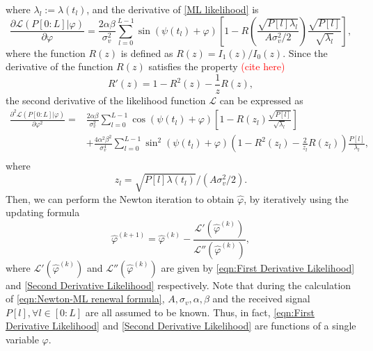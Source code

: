 \documentclass[12pt,draftclsnofoot,journal,onecolumn]{IEEEtran}
\theoremstyle{nonumberplain}
\def \ch {\textcolor{red}{(cite here) }}
\begin{document}
    where $\lambda_l := \lambda(t_l)$, and the derivative of \eqref{ML likelihood} is 
    \begin{equation}
        \frac{\partial \mathcal{L}(P[0:L] | \varphi)}{\partial \varphi} = \frac{2\alpha\beta}{\sigma_v^2}\sum_{l=0}^{L-1}\sin(\psi(t_l)+\varphi) \left[1 - R\left( \frac{\sqrt{P[l]\lambda_l}}{A\sigma_v^2/2} \right) \frac{\sqrt{P[l]}}{\sqrt{\lambda_l}}\right],
        \label{eqn:First Derivative Likelihood}
    \end{equation}
    where the function $R(z)$ is defined as $R(z) = I_1(z)/I_0(z)$. Since the derivative of the function $R(z)$ satisfies the property \ch
    \begin{equation}
        R'(z)=1-R^2(z)-\frac{1}{z}R(z),
        \label{eqn:R function derivative property}
    \end{equation}
    the second derivative of the likelihood function $\mathcal{L}$ can be expressed as
    \begin{equation}
        \begin{aligned}
        \frac{\partial^2 \mathcal{L}(P[0:L] | \varphi)}{\partial \varphi^2}  = &  \frac{2\alpha\beta}{\sigma_v^2} \sum_{l=0}^{L-1}{\cos(\psi(t_l)+\varphi)}\left[1 - R\left(z_l\right) \frac{\sqrt{P[l]}}{\sqrt{\lambda_l}}\right] \\
        & +\frac{4\alpha^2\beta^2}{\sigma_v^4}\sum_{l=0}^{L-1}{\sin^2(\psi(t_l)+\varphi) \left(1-R^2(z_l) -\frac{2}{z_l}R(z_l)\right)\frac{P[l]}{\lambda_l} },\\
        \end{aligned}
        \label{Second Derivative Likelihood}
    \end{equation}
    where
    \begin{equation}
        z_l = \sqrt{P[l]\lambda(t_l)}/(A\sigma_v^2/2).
        \label{eqn:def z_l}
    \end{equation}
    Then, we can perform the Newton iteration to obtain $\hat{\varphi}$, by iteratively using the updating formula
    \begin{equation}
        \hat{\varphi}^{(k+1)} = \hat{\varphi}^{(k)} - \frac{\mathcal{L}'(\hat{\varphi}^{(k)})}{\mathcal{L}''(\hat{\varphi}^{(k)})},
        \label{eqn:Newton-ML renewal formula}
    \end{equation}
    where $\mathcal{L}'(\hat{\varphi}^{(k)})$ and $\mathcal{L}''(\hat{\varphi}^{(k)})$ are given by \eqref{eqn:First Derivative Likelihood} and \eqref{Second Derivative Likelihood} respectively. Note that during the calculation of \eqref{eqn:Newton-ML renewal formula}, $A, \sigma_v, \alpha, \beta$ and the received signal $P[l], \forall l\in [0:L]$ are all assumed to be known. Thus, in fact,  \eqref{eqn:First Derivative Likelihood} and \eqref{Second Derivative Likelihood} are functions of a single variable $\varphi$. 
\end{document}
